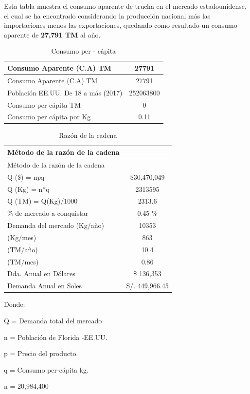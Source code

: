 \documentclass[
  stu,
  floatsintext,
  longtable,
  a4paper,
  nolmodern,
  notxfonts,
  notimes,
  colorlinks=true,linkcolor=blue,citecolor=blue,urlcolor=blue]{apa7}
\begin{document}
Esta tabla muestra el consumo aparente de trucha en el mercado
estadounidense, el cual se ha encontrado considerando la producción
nacional más las importaciones menos las exportaciones, quedando como
resultado un consumo aparente de \textbf{27,791 TM} al año.

\begin{longtable}[]{@{}lc@{}}
\caption{Consumo per - cápita}\tabularnewline
\toprule\noalign{}
Consumo Aparente (C.A) TM & 27791 \\
\midrule\noalign{}
\endfirsthead
\toprule\noalign{}
Consumo Aparente (C.A) TM & 27791 \\
\midrule\noalign{}
\endhead
\bottomrule\noalign{}
\endlastfoot
Población EE.UU. De 18 a más (2017) & 252063800 \\
Consumo per cápita TM & 0 \\
Consumo per cápita por Kg & 0.11 \\
\end{longtable}

\begin{longtable}[]{@{}lc@{}}
\caption{Razón de la cadena}\tabularnewline
\toprule\noalign{}
Método de la razón de la cadena & \\
\midrule\noalign{}
\endfirsthead
\toprule\noalign{}
Método de la razón de la cadena & \\
\midrule\noalign{}
\endhead
\bottomrule\noalign{}
\endlastfoot
Q (\$) = n\emph{p}q & \$30,470,049 \\
Q (Kg) = n*q & 2313595 \\
Q (TM) = Q(Kg)/1000 & 2313.6 \\
\% de mercado a conquistar & 0.45 \% \\
Demanda del mercado (Kg/año) & 10353 \\
(Kg/mes) & 863 \\
(TM/año) & 10.4 \\
(TM/mes) & 0.86 \\
Dda. Anual en Dólares & \$ 136,353 \\
Demanda Anual en Soles & S/. 449,966.45 \\
\end{longtable}

Donde:

Q = Demanda total del mercado

n = Población de Florida -EE.UU.

p = Precio del producto.

q = Consumo per-cápita kg.

n = 20,984,400
\end{document}
